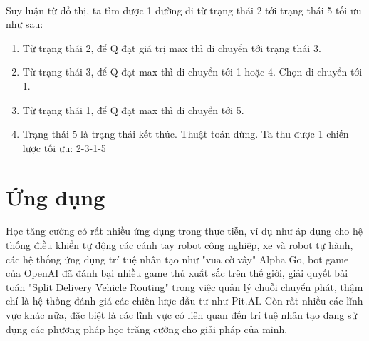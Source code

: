 \documentclass[14pt,a4paper,oneside]{report}		%
\begin{document}
\\
Suy luận từ đồ thị, ta tìm được 1 đường đi từ trạng thái 2 tới trạng thái 5 tối ưu như sau: 
\begin{enumerate}
\item Từ trạng thái 2, để Q đạt giá trị max thì di chuyển tới trạng thái 3. 
\item Từ trạng thái 3, để Q đạt max thì di chuyển tới 1 hoặc 4. Chọn di chuyển tới 1.
\item Từ trạng thái 1, để Q đạt max thì di chuyển tới 5.
\item Trạng thái 5 là trạng thái kết thúc. Thuật toán dừng. Ta thu được 1 chiến lược tối ưu: 2-3-1-5
\end{enumerate}

\chapter{Ứng dụng}
Học tăng cường có rất nhiều ứng dụng trong thực tiễn, ví dụ như áp dụng cho hệ thống điều khiển tự động các cánh tay robot công nghiêp, xe và robot tự hành, các hệ thống ứng dụng trí tuệ nhân tạo như "vua cờ vây" Alpha Go, bot game của OpenAI đã đánh bại nhiều game thủ xuất sắc trên thế giới, giải quyết bài toán "Split Delivery Vehicle Routing" trong việc quản lý chuỗi chuyển phát, thậm chí là hệ thống đánh giá các chiến lược đầu tư như Pit.AI. Còn rất nhiều các lĩnh vực khác nữa, đặc biệt là các lĩnh vực có liên quan đến trí tuệ nhân tạo đang sử dụng các phương pháp học trăng cường cho giải pháp của mình.\\
	
\end{document}
